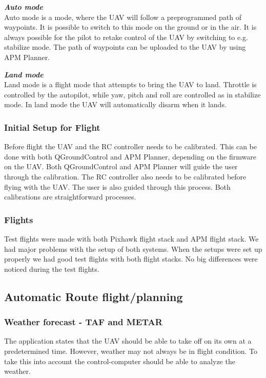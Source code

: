 \emph{\textbf{Auto mode}}\\
Auto mode is a mode, where the UAV will follow a preprogrammed path of waypoints. It is possible to switch to this mode on the ground or in the air. It is always possible for the pilot to retake control of the UAV by switching to e.g. stabilize mode. The path of waypoints can be uploaded to the UAV by using APM Planner.

\emph{\textbf{Land mode}}\\
Land mode is a flight mode that attempts to bring the UAV to land. Throttle is controlled by the autopilot, while yaw, pitch and roll are controlled as in stabilize mode. In land mode the UAV will automatically disarm when it lands.

\subsubsection{Initial Setup for Flight}
Before flight the UAV and the RC controller needs to be calibrated. This can be done with both QGroundControl and APM Planner, depending on the firmware on the UAV.
Both QGroundControl and APM Planner will guide the user through the calibration. The RC controller also needs to be calibrated before flying with the UAV. The user is also guided through this process. Both calibrations are straightforward processes.

\subsubsection{Flights}
Test flights were made with both Pixhawk flight stack and APM flight stack. We had major problems with the setup of both systems. When the setups were set up properly we had good test flights with both flight stacks. No big differences were noticed during the test flights.

\subsection{Automatic Route flight/planning}
\subsubsection{Weather forecast - TAF and METAR}
The application states that the UAV should be able to take off on its own at a predetermined time. However, weather may not always be in flight condition. To take this into account the control-computer should be able to analyze the weather.

